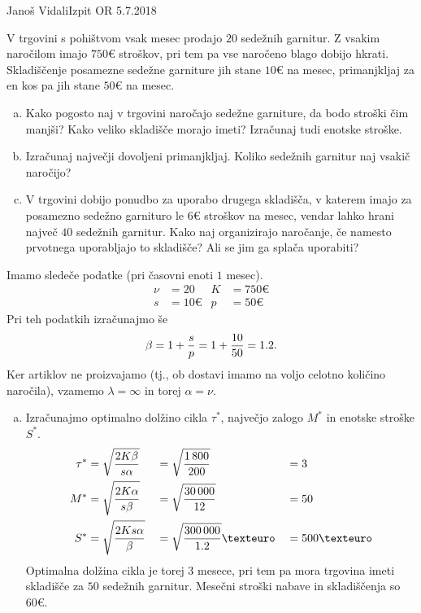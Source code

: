 \begin{naloga}{Janoš Vidali}{Izpit OR 5.7.2018}
\begin{vprasanje}
V trgovini s pohištvom vsak mesec prodajo $20$ sedežnih garnitur.
Z vsakim naročilom imajo $750 €$ stroškov,
pri tem pa vse naročeno blago dobijo hkrati.
Skladiščenje posamezne sedežne garniture jih stane $10 €$ na mesec,
primanjkljaj za en kos pa jih stane $50 €$ na mesec.

\begin{enumerate}[(a)]
\item Kako pogosto naj v trgovini naročajo sedežne garniture,
da bodo stroški čim manjši?
Kako veliko skladišče morajo imeti?
Izračunaj tudi enotske stroške.

\item Izračunaj največji dovoljeni primanjkljaj.
Koliko sedežnih garnitur naj vsakič naročijo?

\item V trgovini dobijo ponudbo za uporabo drugega skladišča,
v katerem imajo za po\-sa\-mez\-no se\-dež\-no garnituro
le $6 €$ stroškov na mesec,
vendar lahko hrani največ $40$ sedežnih garnitur.
Kako naj organizirajo naročanje,
če namesto prvotnega uporabljajo to skladišče?
Ali se jim ga splača uporabiti?
\end{enumerate}
\end{vprasanje}

\begin{odgovor}
Imamo sledeče podatke (pri časovni enoti $1$ mesec).
\begin{align*}
\nu &= 20 &
K &= 750 € \\
s &= 10 € &
p &= 50 €
\end{align*}
Pri teh podatkih izračunajmo še
$$
\beta = 1 + {s \over p} = 1 + {10 \over 50} = 1.2 .
$$
Ker artiklov ne proizvajamo
(tj., ob dostavi imamo na voljo celotno količino naročila),
vzamemo $\lambda = \infty$ in torej $\alpha = \nu$.

\begin{enumerate}[(a)]
\item Izračunajmo optimalno dolžino cikla $\tau^*$,
največjo zalogo $M^*$ in enotske stroš\-ke $S^*$.
\begin{alignat*}{3}
\tau^* &= \sqrt{2K \beta \over s \alpha}
&&= \sqrt{1\,800 \over 200} &&= 3 \\
M^* &= \sqrt{2K \alpha \over s \beta}
&&= \sqrt{30\,000 \over 12} &&= 50 \\
S^* &= \sqrt{2Ks \alpha \over \beta}
&&= \sqrt{300\,000 \over 1.2} € &&= 500 €
\end{alignat*}
Optimalna dolžina cikla je torej $3$ mesece,
pri tem pa mora trgovina imeti skladišče za $50$ sedežnih garnitur.
Mesečni stroški nabave in skladiščenja so $60 €$.


\end{enumerate}
\end{odgovor}
\end{naloga}
